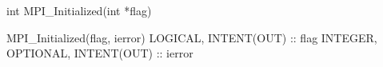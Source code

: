 int MPI_Initialized(int *flag)

MPI_Initialized(flag, ierror)
LOGICAL, INTENT(OUT) :: flag
INTEGER, OPTIONAL, INTENT(OUT) :: ierror
